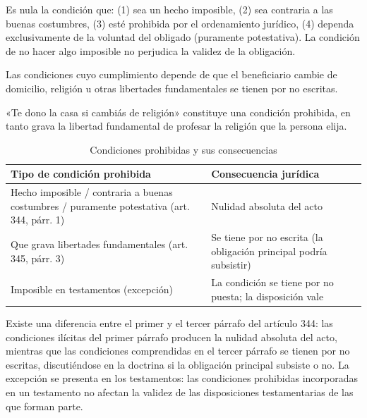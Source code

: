 \documentclass[12pt,oneside]{book}
\begin{document}
\begin{regla}
Es nula la condición que: (1) sea un hecho imposible, (2) sea contraria a las buenas costumbres, (3) esté prohibida por el ordenamiento jurídico, (4) dependa exclusivamente de la voluntad del obligado (puramente potestativa). La condición de no hacer algo imposible no perjudica la validez de la obligación.
\end{regla}

\begin{regla}
Las condiciones cuyo cumplimiento depende de que el beneficiario cambie de domicilio, religión u otras libertades fundamentales se tienen por no escritas.
\end{regla}

\begin{ejemplo}
«Te dono la casa si cambiás de religión» constituye una condición prohibida, en tanto grava la libertad fundamental de profesar la religión que la persona elija.
\end{ejemplo}

\begin{table}[H]
\centering
\begin{tabularx}{\textwidth}{X X}
\toprule
\textbf{Tipo de condición prohibida} & \textbf{Consecuencia jurídica} \\
\midrule
Hecho imposible / contraria a buenas costumbres / puramente potestativa (art. 344, párr. 1) & Nulidad absoluta del acto \\
Que grava libertades fundamentales (art. 345, párr. 3) & Se tiene por no escrita (la obligación principal podría subsistir) \\
Imposible en testamentos (excepción) & La condición se tiene por no puesta; la disposición vale \\
\bottomrule
\end{tabularx}
\caption{Condiciones prohibidas y sus consecuencias}
\end{table}

Existe una diferencia entre el primer y el tercer párrafo del artículo 344: las condiciones ilícitas del primer párrafo producen la nulidad absoluta del acto, mientras que las condiciones comprendidas en el tercer párrafo se tienen por no escritas, discutiéndose en la doctrina si la obligación principal subsiste o no. La excepción se presenta en los testamentos: las condiciones prohibidas incorporadas en un testamento no afectan la validez de las disposiciones testamentarias de las que forman parte.
\end{document}
